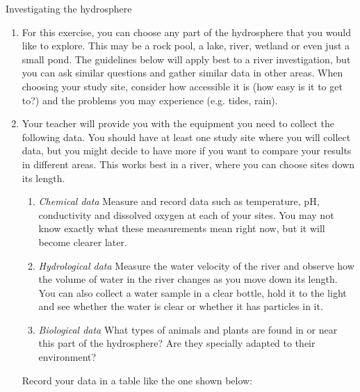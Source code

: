             \begin{Investigation}{Investigating the hydrosphere
      }
            \nopagebreak
      \label{m38138*id334584}\begin{enumerate}[noitemsep, label=\textbf{\arabic*}. ] 
            \label{m38138*uid4}\item 
For this exercise, you can choose any part of the hydrosphere that you would like to explore. This may be a rock pool, a lake, river, wetland or even just a small pond. The guidelines below will apply best to a river investigation, but you can ask similar questions and gather similar data in other areas. When choosing your study site, consider how accessible it is (how easy is it to get to?) and the problems you may experience (e.g. tides, rain).
\label{m38138*uid5}\item 
Your teacher will provide you with the equipment you need to collect the following data. You should have at least one study site where you will collect data, but you might decide to have more if you want to compare your results in different areas. This works best in a river, where you can choose sites down its length.
\label{m38138*id334646}\begin{enumerate}[noitemsep, label=\textbf{\alph*}. ] 
            \label{m38138*uid6}\item \textsl{Chemical data}
Measure and record data such as temperature, pH, conductivity and dissolved oxygen at each of your sites. You may not know exactly what these measurements mean right now, but it will become clearer later.
\label{m38138*uid7}\item \textsl{Hydrological data}
Measure the water velocity of the river and observe how the volume of water in the river changes as you move down its length. You can also collect a water sample in a clear bottle, hold it to the light and see whether the water is clear or whether it has particles in it.
\label{m38138*uid8}\item \textsl{Biological data}
What types of animals and plants are found in or near this part of the hydrosphere? Are they specially adapted to their environment?
\end{enumerate}
Record your data in a table like the one shown below:
          \begin{table}[H]
        \begin{center}

\end{center}
\end{table}
\end{enumerate}
\end{Investigation}
